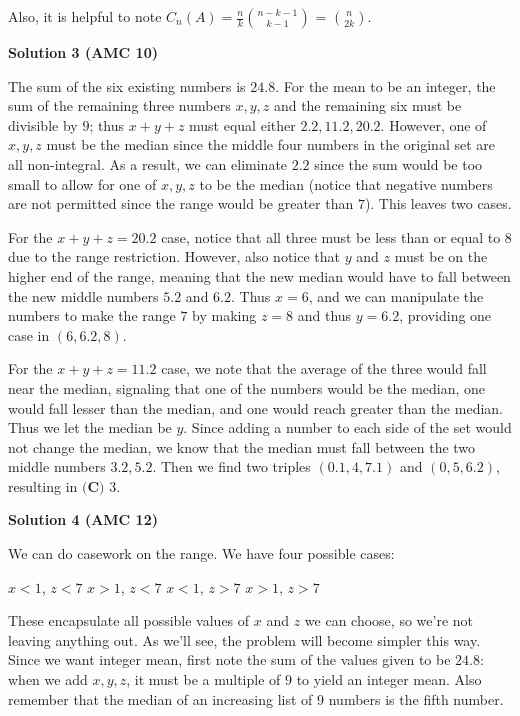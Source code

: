 \begin{enumerate}
 Also, it is helpful to note \( C_n(A) = \frac{n}{k} \binom{n-k-1}{k-1} \) = \( \binom{n}{2k} \).

 



\textbf{Solution 3 (AMC 10)}

The sum of the six existing numbers is $24.8$. For the mean to be an integer, the sum of the remaining three numbers $x,y,z$ and the remaining six must be divisible by $9$; thus $x+y+z$ must equal either $2.2,11.2,20.2$. However, one of $x,y,z$ must be the median since the middle four numbers in the original set are all non-integral. As a result, we can eliminate $2.2$ since the sum would be too small to allow for one of $x,y,z$ to be the median (notice that negative numbers are not permitted since the range would be greater than $7$). This leaves two cases.

 For the $x+y+z=20.2$ case, notice that all three must be less than or equal to $8$ due to the range restriction. However, also notice that $y$ and $z$ must be on the higher end of the range, meaning that the new median would have to fall between the new middle numbers $5.2$ and $6.2$. Thus $x=6$, and we can manipulate the numbers to make the range $7$ by making $z=8$ and thus $y=6.2$, providing one case in $(6,6.2,8)$.

 For the $x+y+z=11.2$ case, we note that the average of the three would fall near the median, signaling that one of the numbers would be the median, one would fall lesser than the median, and one would reach greater than the median. Thus we let the median be $y$. Since adding a number to each side of the set would not change the median, we know that the median must fall between the two middle numbers $3.2,5.2$. Then we find two triples $(0.1,4,7.1)$ and $(0,5,6.2)$, resulting in $\boxed{\textbf{(C) }3}$.

 



\textbf{Solution 4 (AMC 12)}

We can do casework on the range. We have four possible cases:

 $x<1$, $z<7$
$x>1$, $z<7$
$x<1$, $z>7$
$x>1$, $z>7$

 These encapsulate all possible values of $x$ and $z$ we can choose, so we're not leaving anything out. As we'll see, the problem will become simpler this way. Since we want integer mean, first note the sum of the values given to be $24.8$: when we add $x,y,z$, it must be a multiple of $9$ to yield an integer mean. Also remember that the median of an increasing list of $9$ numbers is the fifth number.


\end{enumerate}
